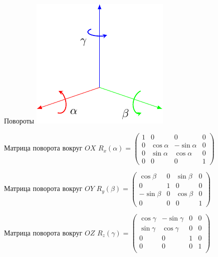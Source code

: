 \documentclass[10pt]{beamer}
\begin{document}
	\begin{frame}{Повороты}
		{
			\includegraphics{rotations.pdf}
		}
		{
			\begin{block}{Матрица поворота вокруг $OX$}
				\centering 
				$ R_x(\alpha)
				 =
				 \begin{pmatrix}
				 	1&0&0&0\\
				 	0&\cos\alpha&-\sin\alpha&0\\
				 	0&\sin\alpha&\cos\alpha&0\\
				 	0&0&0&1				 	
				 \end{pmatrix}
				 $				
			\end{block}
			
			
		}
		
		{
			\begin{block}{Матрица поворота вокруг $OY$}
				\centering 
				$ R_y(\beta)
				=
				\begin{pmatrix}
					\cos\beta&0&\sin\beta&0\\
					0&1&0&0\\
					-\sin\beta&0&\cos\beta &0\\
					0&0&0&1				 	
				\end{pmatrix}
				$				
			\end{block}
		}
		{
				\begin{block}{Матрица поворота вокруг $OZ$}
				\centering 
				$ R_z(\gamma)
				=
				\begin{pmatrix}
					\cos\gamma&-\sin\gamma&0&0\\
					\sin\gamma&\cos\gamma&0&0\\
					0&0&1&0 \\
					0&0&0&1	\\			 	
				\end{pmatrix}
				$				
			\end{block}
		}
	\end{frame}
	
\end{document}
